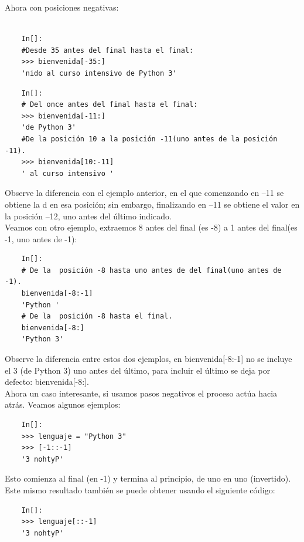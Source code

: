 Ahora con posiciones negativas:

\begin{lstlisting}
	
	In[]:	
	#Desde 35 antes del final hasta el final:
	>>> bienvenida[-35:]
	'nido al curso intensivo de Python 3'
\end{lstlisting}




\begin{lstlisting}
	In[]:	
	# Del once antes del final hasta el final:
	>>> bienvenida[-11:]
	'de Python 3'
	#De la posición 10 a la posición -11(uno antes de la posición -11).
	>>> bienvenida[10:-11]
	' al curso intensivo '
\end{lstlisting}


\noindent Observe la diferencia con el ejemplo anterior, en el que comenzando en –11 se obtiene la {\ttfamily d} en esa  posición; sin embargo, finalizando en –11 se obtiene el valor en la posición  –12, uno antes del último indicado.\\

Veamos con otro ejemplo, extraemos 8 antes del final (es -8)  a 1 antes del final(es -1, uno antes de -1):

\begin{lstlisting}
	In[]:
	# De la  posición -8 hasta uno antes de del final(uno antes de -1).
	bienvenida[-8:-1]
	'Python '
	# De la  posición -8 hasta el final.
	bienvenida[-8:]
	'Python 3'
\end{lstlisting}


\noindent Observe la diferencia entre estos dos ejemplos, en {\ttfamily bienvenida[-8:-1]} no se incluye el 3 (de Python 3) uno antes del último, para incluir el último se deja por defecto: {\ttfamily bienvenida[-8:]}. \\


Ahora un caso interesante, si usamos  pasos negativos el proceso actúa hacia atrás. Veamos algunos ejemplos:  


\begin{lstlisting}
	In[]:	
	>>> lenguaje = "Python 3"
	>>> [-1::-1]
	'3 nohtyP'
\end{lstlisting}
Esto comienza al final (en -1) y termina al principio, de uno en uno (invertido). Este mismo resultado también 
se puede  obtener usando el siguiente código:

\begin{lstlisting}
	In[]:
	>>> lenguaje[::-1] 
	'3 nohtyP'
\end{lstlisting}


